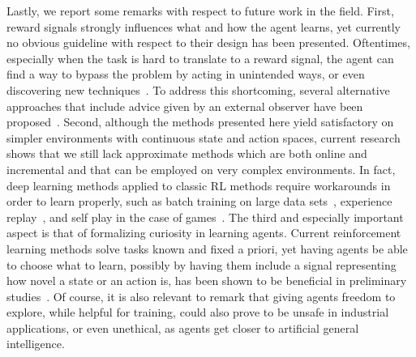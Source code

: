 Lastly, we report some remarks with respect to future work in the field. First, reward signals strongly influences what and how the agent learns, yet currently no obvious guideline with respect to their design has been presented. Oftentimes, especially when the task is hard to translate to a reward signal, the agent can find a way to bypass the problem by acting in unintended ways, or even discovering new techniques~\cite{baker2019}. To address this shortcoming, several alternative approaches that include advice given by an external observer have been proposed~\cite{clouse1992teaching, maclin1994}. Second, although the methods presented here yield satisfactory on simpler environments with continuous state and action spaces, current research shows that we still lack approximate methods which are both online and incremental and that can be employed on very complex environments. In fact, deep learning methods applied to classic RL methods require workarounds in order to learn properly, such as batch training on large data sets~\cite{mnih2013dqn}, experience replay~\cite{lin1992}, and self play in the case of games~\cite{silver2016go}. The third and especially important aspect is that of formalizing curiosity in learning agents. Current reinforcement learning methods solve tasks known and fixed a priori, yet having agents be able to choose what to learn, possibly by having them include a signal representing how novel a state or an action is, has been shown to be beneficial in preliminary studies~\cite{schmidhuber1991a, schmidhuber1991b}. Of course, it is also relevant to remark that giving agents freedom to explore, while helpful for training, could also prove to be unsafe in industrial applications, or even unethical, as agents get closer to  artificial general intelligence.
